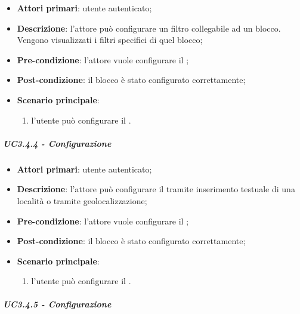 \begin{itemize}
\item \textbf{Attori primari}: utente autenticato;

\item \textbf{Descrizione}: l'attore può configurare un filtro collegabile ad un blocco. Vengono visualizzati i filtri specifici di quel blocco;

\item \textbf{Pre-condizione}: l'attore vuole configurare il \BFiltro{};

\item \textbf{Post-condizione}:  il blocco è stato configurato correttamente;

\item \textbf{Scenario principale}:
\begin{enumerate}
\item  l'utente può configurare il \BFiltro{}.

\end{enumerate}
\end{itemize}

\subparagraph{UC3.4.4 - Configurazione \BMeteo{}}

\begin{itemize}
\item \textbf{Attori primari}: utente autenticato;

\item \textbf{Descrizione}: l'attore può configurare il \BMeteo{} tramite inserimento testuale di una località o tramite geolocalizzazione;

\item \textbf{Pre-condizione}: l'attore vuole configurare il \BMeteo{};

\item \textbf{Post-condizione}:  il blocco è stato configurato correttamente;

\item \textbf{Scenario principale}:
\begin{enumerate}
\item  l'utente può configurare il \BMeteo{}.

\end{enumerate}
\end{itemize}

\subparagraph{UC3.4.5 - Configurazione \BInstagram{}}

